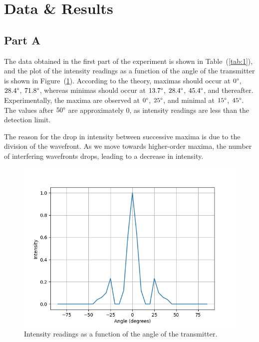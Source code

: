 \documentclass[10pt]{article}
\begin{document}
\section{Data \& Results}

\subsection*{Part A}

The data obtained in the first part of the experiment is shown in Table~(\ref{tab:1}), and the plot of the intensity readings as a function of the angle of the transmitter is shown in Figure~(\ref{fig:3}). According to the theory, maximas should occur at $0\degree$, $28.4\degree$, $71.8\degree$, whereas minimas should occur at $13.7\degree$, $28.4\degree$, $45.4\degree$, and thereafter. Experimentally, the maxima are observed at $0\degree$, $25\degree$, and minimal at $15\degree$, $45\degree$. The values after $50\degree$ are approximately 0, as intensity readings are less than the detection limit.

The reason for the drop in intensity between successive maxima is due to the division of the wavefront. As we move towards higher-order maxima, the number of interfering wavefronts drops, leading to a decrease in intensity. 

\begin{figure}
  \centering
  \includegraphics[scale=0.6]{plots/plot1.png}
  \caption{Intensity readings as a function of the angle of the transmitter.}
  \label{fig:3}
\end{figure}
\end{document}
